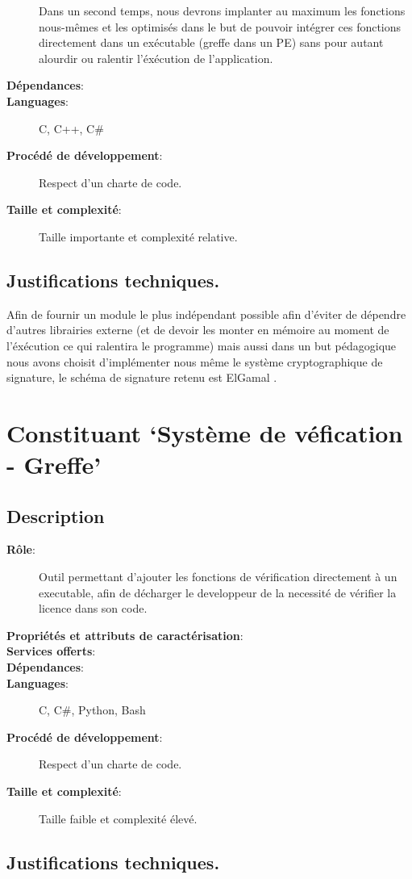 \begin{description}
			Dans un second temps, nous devrons implanter au maximum les fonctions nous-mêmes et les optimisés dans le but
			de pouvoir intégrer ces fonctions directement dans un exécutable (greffe dans un PE) sans pour autant alourdir
			ou ralentir l'éxécution de l'application.

	\item[\textbf{Dépendances}:]
	\item[\textbf{Languages}:]
		C, C++, C\#
	\item[\textbf{Procédé de développement}:]
		Respect d'un charte de code. 
	\item[\textbf{Taille et complexité}:]
		Taille importante et complexité relative.
\end{description}

\subsection{Justifications techniques.}
Afin de fournir un module le plus indépendant possible afin d'éviter de dépendre d'autres 
librairies externe (et de devoir les monter en mémoire au moment de l'éxécution ce qui 
ralentira le programme) mais aussi dans un but pédagogique nous avons choisit d'implémenter nous même le système cryptographique de signature, le schéma de signature retenu est 
ElGamal \cite{ElGamal}.

\section{Constituant `Système de véfication - Greffe'}
\subsection{Description}
\begin{description}
	\item[\textbf{Rôle}:]
			Outil permettant d'ajouter les fonctions de vérification directement à un
			executable, afin de décharger le developpeur de la necessité de vérifier 
			la licence dans son code.
	\item[\textbf{Propriétés et attributs de caractérisation}:]
	\item[\textbf{Services offerts}:]
	\item[\textbf{Dépendances}:]
	\item[\textbf{Languages}:]
		C, C\#, Python, Bash 
	\item[\textbf{Procédé de développement}:]
		Respect d'un charte de code. 
	\item[\textbf{Taille et complexité}:]
		Taille faible et complexité élevé.
\end{description}

\subsection{Justifications techniques.}

